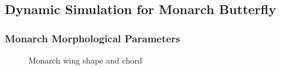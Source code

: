 \documentclass[10pt]{article}
\begin{document}
\subsection{Dynamic Simulation for Monarch Butterfly}

\subsubsection{Monarch Morphological Parameters}

\begin{figure}
    \centerline{
        \hfill
    }
    \caption{Monarch wing shape and chord}\label{fig:Monarch_wing}
\end{figure}
\end{document}
